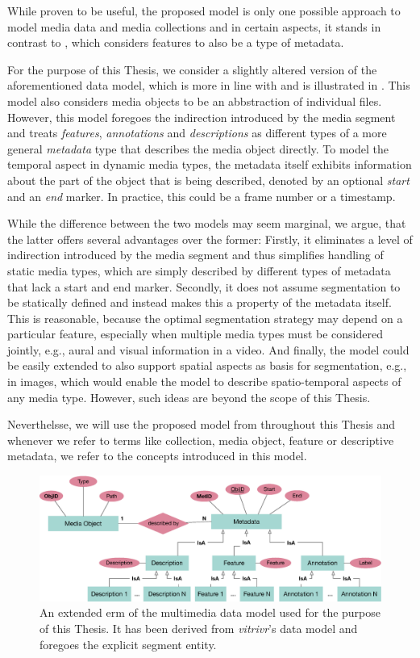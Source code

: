 While proven to be useful, the proposed model is only one possible approach to model media data and media collections and in  certain aspects, it stands in contrast to \cite{Blanken:2007multimedia}, which considers features to also be a type of metadata. 

For the purpose of this Thesis, we consider a slightly altered version of the aforementioned data model, which is more in line with \cite{Blanken:2007multimedia} and is illustrated in . This model also considers media objects to be an abbstraction of individual files. However, this model foregoes the indirection introduced by the media segment and treats \emph{features}, \emph{annotations} and \emph{descriptions} as different types of a more general \emph{metadata} type that describes the media object directly. To model the temporal aspect in dynamic media types, the metadata itself exhibits information about the part of the object that is being described, denoted by an optional \emph{start} and an \emph{end} marker. In practice, this could be a frame number or a timestamp.

While the difference between the two models may seem marginal, we argue, that the latter offers several advantages over the former: Firstly, it eliminates a level of indirection introduced by the media segment and thus simplifies handling of static media types, which are simply described by different types of metadata that lack a start and end marker. Secondly, it does not assume segmentation to be statically defined and instead makes this a property of the metadata itself. This is reasonable, because the optimal segmentation strategy may depend on a particular feature, especially when multiple media types must be considered jointly, e.g., aural and visual information in a video. And finally, the model could be easily extended to also support spatial aspects as basis for segmentation, e.g., in images, which would enable the model to describe spatio-temporal aspects of any media type. However, such ideas are beyond the scope of this Thesis. 

Neverthelsse, we will use the proposed model from  throughout this Thesis and whenever we refer to terms like collection, media object, feature or descriptive metadata, we refer to the concepts introduced in this model.

\begin{figure}[bt]
    \centering
    \includegraphics[width=\textwidth]{figures/erm-media-data}
    \caption{An extended \acrshort{erm} of the multimedia data model used for the purpose of this Thesis. It has been derived from \emph{vitrivr}'s data model and foregoes the explicit segment entity.}
    \label{figure:erm_mediadata}
\end{figure}

